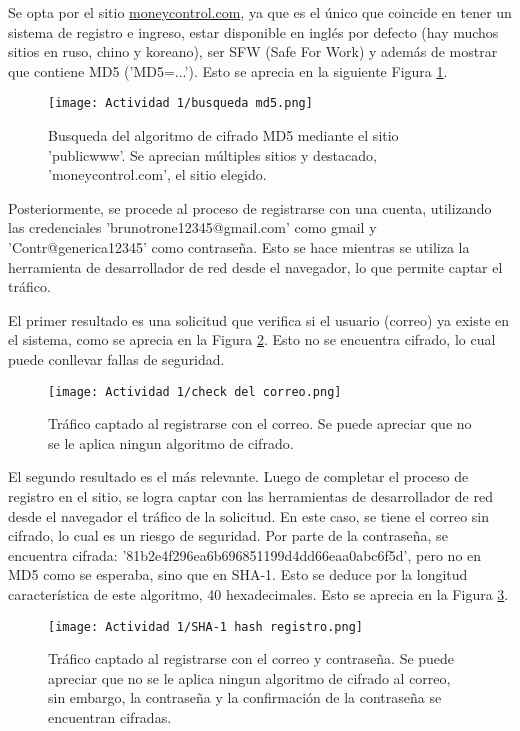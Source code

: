 \documentclass[letter,12pt]{article}
\begin{document}
Se opta por el sitio \href{https://www.moneycontrol.com/}{moneycontrol.com}, ya que es el único que coincide en tener un sistema de registro e ingreso, estar disponible en inglés por defecto (hay muchos sitios en ruso, chino y koreano), ser SFW (Safe For Work) y además de mostrar que contiene MD5 ('MD5=...'). Esto se aprecia en la siguiente Figura \ref{fig:busqueda md5}.

\begin{figure}[H]
    \centering
    \texttt{[image: Actividad 1/busqueda md5.png]}
    \caption{Busqueda del algoritmo de cifrado MD5 mediante el sitio 'publicwww'. Se aprecian múltiples sitios y destacado, 'moneycontrol.com', el sitio elegido.}
    \label{fig:busqueda md5}
\end{figure}

Posteriormente, se procede al proceso de registrarse con una cuenta, utilizando las credenciales 'brunotrone12345@gmail.com' como gmail y 'Contr@generica12345' como contraseña. Esto se hace mientras se utiliza la herramienta de desarrollador de red desde el navegador, lo que permite captar el tráfico. 

El primer resultado es una solicitud que verifica si el usuario (correo) ya existe en el sistema, como se aprecia en la Figura \ref{fig:check del correo}. Esto no se encuentra cifrado, lo cual puede conllevar fallas de seguridad.

\begin{figure}[H]
    \centering
    \texttt{[image: Actividad 1/check del correo.png]}
    \caption{Tráfico captado al registrarse con el correo. Se puede apreciar que no se le aplica ningun algoritmo de cifrado.}
    \label{fig:check del correo}
\end{figure}

El segundo resultado es el más relevante. Luego de completar el proceso de registro en el sitio, se logra captar con las herramientas de desarrollador de red desde el navegador el tráfico de la solicitud. En este caso, se tiene el correo sin cifrado, lo cual es un riesgo de seguridad. Por parte de la contraseña, se encuentra cifrada: '81b2e4f296ea6b696851199d4dd66eaa0abc6f5d', pero no en MD5 como se esperaba, sino que en SHA-1. Esto se deduce por la longitud característica de este algoritmo, 40 hexadecimales. Esto se aprecia en la Figura \ref{fig:SHA-1 hash registro}.

\begin{figure}[H]
    \centering
    \texttt{[image: Actividad 1/SHA-1 hash registro.png]}
    \caption{Tráfico captado al registrarse con el correo y contraseña. Se puede apreciar que no se le aplica ningun algoritmo de cifrado al correo, sin embargo, la contraseña y la confirmación de la contraseña se encuentran cifradas.}
    \label{fig:SHA-1 hash registro}
\end{figure}
\end{document}
